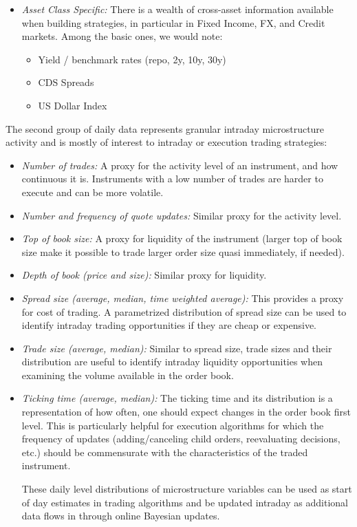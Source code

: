 \begin{itemize}
\item \emph{Asset Class Specific:} There is a wealth of cross-asset information available when building strategies, in particular in Fixed Income, FX, and Credit markets. Among the basic ones, we would note:
        \begin{itemize}
        \item Yield / benchmark rates (repo, 2y, 10y, 30y)
        \item CDS Spreads
        \item US Dollar Index
        \end{itemize}
\end{itemize}


The second group of daily data represents granular intraday microstructure activity and is mostly of interest to intraday or execution trading strategies:
        \begin{itemize}
        \item \emph{Number of trades:} A proxy for the activity level of an instrument, and how continuous it is. Instruments with a low number of trades are harder to execute and can be more volatile. 
        
        \item \emph{Number and frequency of quote updates:} Similar proxy for the activity level.
        
        \item \emph{Top of book size:} A proxy for liquidity of the instrument (larger top of book size make it possible to trade larger order size quasi immediately, if needed).
        
        \item \emph{Depth of book (price and size):} Similar proxy for liquidity.
        
        \item \emph{Spread size (average, median, time weighted average):} This provides a proxy for cost of trading. A parametrized distribution of spread size can be used to identify intraday trading opportunities if they are cheap or expensive.
        
        \item \emph{Trade size (average, median):} Similar to spread size, trade sizes and their distribution are useful to identify intraday liquidity opportunities when examining the volume available in the order book.
        
        \item \emph{Ticking time (average, median):} The ticking time and its distribution is a representation of how often, one should expect changes in the order book first level. This is particularly helpful for execution algorithms for which the frequency of updates (adding/canceling child orders, reevaluating decisions, etc.) should be commensurate with the characteristics of the traded instrument.
        
        These daily level distributions of microstructure variables can be used as start of day estimates in trading algorithms and be updated intraday as additional data flows in through online Bayesian updates.
        \end{itemize}


